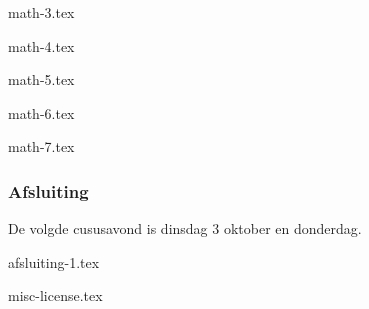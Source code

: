 \documentclass[allauthors,dutch]{../../../cursuspresentatie}
\def\importslide#1#2{%
	{#2}
}
\begin{document}
\importslide{beginners_NL}{math-3.tex}

\importslide{beginners_NL}{math-4.tex}

\importslide{beginners_NL}{math-5.tex}

\importslide{beginners_NL}{math-6.tex}

\importslide{beginners_NL}{math-7.tex}



\begin{frame}
	\frametitle{Afsluiting}
	
	De volgde cususavond is dinsdag 3 oktober en donderdag.
\end{frame}
{afsluiting-1.tex}
	
{misc-license.tex}
\end{document}
